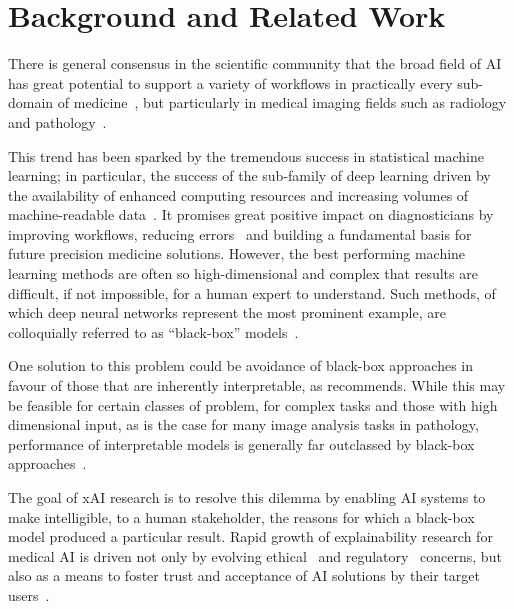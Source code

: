 \section{Background and Related Work}

There is general consensus in the scientific community that the broad field of AI has great potential to support a variety of workflows in practically every sub-domain of medicine~\cite{hamet2017artificial}, but particularly in medical imaging fields such as radiology and pathology~\cite{WulczynEtAl:2021:AImed-example}.

This trend has been sparked by the tremendous success in statistical machine learning; in particular, the success of the sub-family of deep learning driven by the availability of enhanced computing resources and increasing volumes of machine-readable data~\cite{LeCunBengioHinton:2015:DeepLearningNature}. It promises great positive impact on diagnosticians by improving workflows, reducing errors~\cite{Topol:2019:NatureMedicine} and building a fundamental basis for future precision medicine solutions. However, the best performing machine learning methods are often so high-dimensional and complex that results are difficult, if not impossible, for a human expert to understand. Such methods, of which deep neural networks represent the most prominent example, are colloquially referred to as ``black-box'' models~\cite{Castelvecchi:2016:OpenBlack}.

One solution to this problem could be avoidance of black-box approaches in favour of those that are inherently interpretable, as \citet{Rudin:2019:interpretable} recommends. While this may be feasible for certain classes of problem, for complex tasks and those with high dimensional input, as is the case for many image analysis tasks in pathology, performance of interpretable models is generally far outclassed by black-box approaches~\cite{arrieta2020explainable, Holzinger:2020:explainable}.

The goal of xAI research is to resolve this dilemma by enabling AI systems to make intelligible, to a human stakeholder, the reasons for which a black-box model produced a particular result. Rapid growth of explainability research for medical AI is driven not only by evolving ethical~\cite{MuellerEtAl:2021:TenCommandments} and regulatory~\cite{Schneeberger:2020:legalAI} concerns, but also as a means to foster trust and acceptance of AI solutions by their target users~\cite{GuidottiPedreschi:2019:Survey, ProsperiEtAl:2020:CausalHealth, Ferrario:trustmedicalai, gaube:trustmedicalai:2021, kastner2021relation}.

